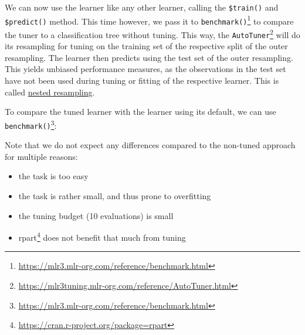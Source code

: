\documentclass[12pt,]{scrbook}
\newenvironment{Shaded}{}{}
\newcommand{\DataTypeTok}[1]{#1}
\newcommand{\DecValTok}[1]{#1}
\newcommand{\KeywordTok}[1]{\textcolor[rgb]{0.00,0.00,1.00}{#1}}
\newcommand{\NormalTok}[1]{#1}
\newcommand{\OperatorTok}[1]{#1}
\newcommand{\StringTok}[1]{\textcolor[rgb]{0.00,0.50,0.50}{#1}}
\providecommand{\tightlist}{%
  \setlength{\itemsep}{0pt}\setlength{\parskip}{0pt}}
\renewcommand{\href}[2]{#2\footnote{\url{#1}}}
\begin{document}
We can now use the learner like any other learner, calling the \texttt{\$train()} and \texttt{\$predict()} method.
This time however, we pass it to \href{https://mlr3.mlr-org.com/reference/benchmark.html}{\texttt{benchmark()}} to compare the tuner to a classification tree without tuning.
This way, the \href{https://mlr3tuning.mlr-org.com/reference/AutoTuner.html}{\texttt{AutoTuner}} will do its resampling for tuning on the training set of the respective split of the outer resampling.
The learner then predicts using the test set of the outer resampling.
This yields unbiased performance measures, as the observations in the test set have not been used during tuning or fitting of the respective learner.
This is called \protect\hyperlink{nested-resampling}{nested resampling}.

To compare the tuned learner with the learner using its default, we can use \href{https://mlr3.mlr-org.com/reference/benchmark.html}{\texttt{benchmark()}}:

\begin{Shaded}
\end{Shaded}

Note that we do not expect any differences compared to the non-tuned approach for multiple reasons:

\begin{itemize}
\tightlist
\item
  the task is too easy
\item
  the task is rather small, and thus prone to overfitting
\item
  the tuning budget (10 evaluations) is small
\item
  \href{https://cran.r-project.org/package=rpart}{rpart} does not benefit that much from tuning
\end{itemize}
\end{document}
